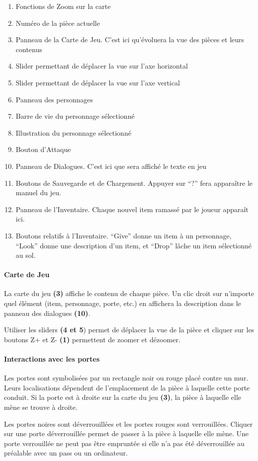 \documentclass[./standalone.tex]{subfiles}
\begin{document}
	\begin{enumerate}
		\item Fonctions de Zoom sur la carte
		\item Numéro de la pièce actuelle
		\item Panneau de la Carte de Jeu. C’est ici qu’évoluera la vue des pièces et leurs contenus
		
		\item Slider permettant de déplacer la vue sur l'axe horizontal
		\item Slider permettant de déplacer la vue sur l'axe vertical
		\item Panneau des personnages
		
		\item Barre de vie du personnage sélectionné
		\item Illustration du personnage sélectionné
		\item Bouton d’Attaque
		
		\item Panneau de Dialogues. C’est ici que sera affiché le texte en jeu
		\item Boutons de Sauvegarde et de Chargement. Appuyer sur “?” fera apparaître le manuel du jeu.
		\item Panneau de l’Inventaire. Chaque nouvel item ramassé par le joueur apparaît ici.
		
		\item Boutons relatifs à l’Inventaire. “Give” donne un item à un personnage, “Look” donne une description d’un item, et “Drop” lâche un item sélectionné au sol.
	\end{enumerate}
\newpage


\paragraph{Carte de Jeu\\}
    La carte du jeu \textbf{(3)} affiche le contenu de chaque pièce. Un clic droit sur n’importe quel élément (item, personnage, porte, etc.) en affichera la description dans le panneau des dialogues \textbf{(10)}.
\par Utiliser les sliders \textbf{(4 et 5}) permet de déplacer la vue de la pièce et cliquer sur les boutons Z+ et Z- \textbf{(1)} permettent de zoomer et dézoomer.

\paragraph{Interactions avec les portes\\}
    Les portes sont symbolisées par un rectangle noir ou rouge placé contre un mur. Leurs localisations dépendent de l’emplacement de la pièce à laquelle cette porte conduit. Si la porte est à droite sur la carte du jeu \textbf{(3)}, la pièce à laquelle elle mène se trouve à droite. 
\par Les portes noires sont déverrouillées et les portes rouges sont verrouillées. Cliquer sur une porte déverrouillée permet de passer à la pièce à laquelle elle mène. Une porte verrouillée ne peut pas être empruntée si elle n’a pas été déverrouillée au préalable avec un pass ou un ordinateur.
        
\end{document}
